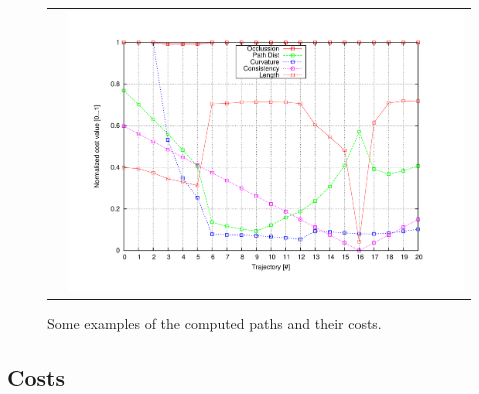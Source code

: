 \begin{figure}[h!]
\begin{tabular}{cc}
\begin{minipage}{.45\textwidth}
    \end{minipage} &
    \begin{minipage}{.45\textwidth}
      \centering
      \includegraphics[width=\textwidth,trim=50 40 80 60,clip]{costs17}\label{fig:cp07_example9}
    \end{minipage}
    \end{tabular} 
    \caption{Some examples of the computed paths and their costs.}\label{fig:cp07_examples}
\end{figure}

\subsection{Costs}\label{ch:chapter07_02_02}

